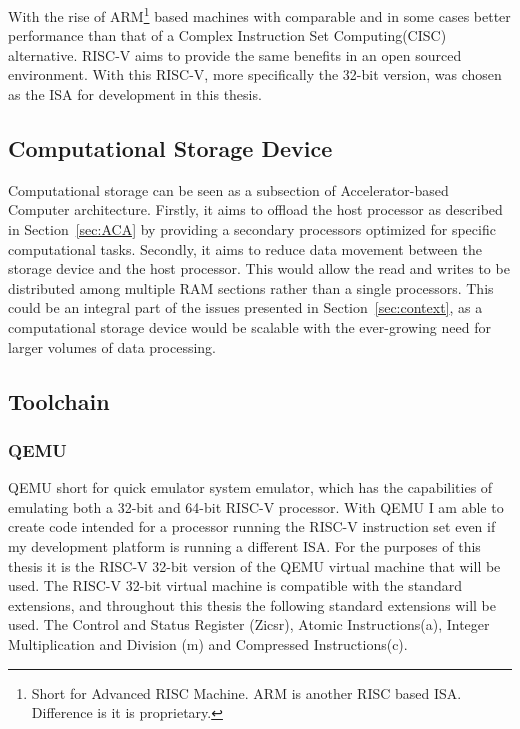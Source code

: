 With the rise of ARM\footnote{Short for Advanced RISC Machine. ARM is another
RISC based ISA. Difference is it is proprietary.} based machines with comparable
and in some cases better performance than that of a Complex Instruction Set
Computing(CISC) alternative\cite{Power_Struggle}. RISC-V aims to provide the
same benefits in an open sourced environment. With this RISC-V, more
specifically the 32-bit version, was chosen as the ISA for development in this
thesis.

\subsection{Computational Storage Device}
Computational storage can be seen as a subsection of Accelerator-based Computer
architecture. Firstly, it aims to offload the host processor as described in
Section~\ref{sec:ACA} by providing a secondary processors optimized for specific
computational tasks. Secondly, it aims to reduce data movement between the
storage device and the host processor. This would allow the read and writes to
be distributed among multiple RAM sections rather than a single processors. This
could be an integral part of the issues presented in Section~\ref{sec:context},
as a computational storage device would be scalable with the ever-growing
nee\label{sec:sys-info}d for larger volumes of data processing.


\subsection{Toolchain}\label{sec:toolchain}
\subsubsection*{QEMU}
QEMU short for quick emulator system emulator, which has the capabilities of
emulating both a 32-bit and 64-bit RISC-V processor\cite{QEMU}. With QEMU I am
able to create code intended for a processor running the RISC-V instruction set
even if my development platform is running a different ISA. For the purposes
of this thesis it is the RISC-V 32-bit version of the QEMU virtual machine that
will be used. The RISC-V 32-bit virtual machine is compatible with the standard
extensions, and throughout this thesis the following standard extensions will be
used. The Control and Status Register (Zicsr), Atomic Instructions(a), Integer
Multiplication and Division (m) and Compressed Instructions(c).

